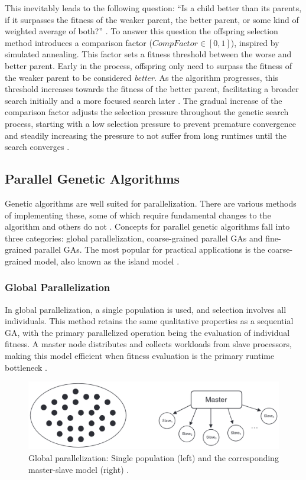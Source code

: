 \documentclass[sigconf]{acmart}
\begin{document}
This inevitably leads to the following question:
\enquote{Is a child better than its parents, if it surpasses the fitness of the
weaker parent, the better parent, or some kind of weighted average of both?}
\cite{Affenzeller2009}.
To answer this question the offspring selection method introduces a comparison
factor ($CompFactor \in [0, 1]$), inspired by simulated annealing. This factor
sets a fitness threshold between the worse and better parent. Early in the
process, offspring only need to surpass the fitness of the weaker parent to
be considered \textit{better}. As the algorithm progresses, this threshold
increases towards the fitness of the better parent, facilitating a broader
search initially and a more focused search later \cite{Affenzeller2009}.
The gradual increase of the comparison factor adjusts the selection pressure
throughout the genetic search process, starting with a low selection pressure
to prevent premature convergence and steadily increasing the pressure to
not suffer from long runtimes until the search converges \cite{Affenzeller2009}.


\subsection{Parallel Genetic Algorithms}
Genetic algorithms are well suited for parallelization. There are various
methods of implementing these, some of which require fundamental changes to the
algorithm and others do not \cite{Affenzeller2009}.
%
Concepts for parallel genetic algorithms fall into three categories:
global parallelization, coarse-grained parallel GAs and fine-grained parallel
GAs. The most popular for practical applications is the coarse-grained model,
also known as the island model \cite{Affenzeller2009}.

\subsubsection*{Global Parallelization}
In global parallelization, a single population is used, and selection involves
all individuals. This method retains the same qualitative properties as a
sequential GA, with the primary parallelized operation being the evaluation of
individual fitness. A master node distributes and collects workloads from slave
processors, making this model efficient when fitness evaluation is the primary
runtime bottleneck \cite{Affenzeller2009}.
\begin{figure}[h]
  \includegraphics[scale=0.22]{assets/parallel-ga-global.png}
  \caption{
    Global parallelization: Single population (left) and the corresponding
    master-slave model (right) \cite{Affenzeller2009}.
  }
\end{figure}
\end{document}
